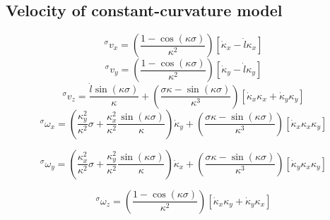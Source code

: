 \chapter{}
\section{Velocity of constant-curvature model}

\begin{equation}
	^\sigma v_x = \left( \frac{1 - \cos(\kappa \sigma)}{\kappa^2} \right) \left[ \dot{\kappa}_x - \dot{l}\kappa_x  \right]
\end{equation}
\begin{equation}
	^\sigma v_y = \left( \frac{1 - \cos(\kappa \sigma)}{\kappa^2} \right) \left[ \dot{\kappa}_y - \dot{l}\kappa_y  \right]
\end{equation}
\begin{equation}
	^\sigma v_z =  \frac{ \dot{l} \sin(\kappa \sigma)}{\kappa}  + \left( \frac{\sigma \kappa - \sin(\kappa \sigma)}{\kappa^3} \right) \left[\dot{\kappa}_x \kappa_x + \dot{\kappa}_y \kappa_y \right]
\end{equation}
\begin{equation}
	^\sigma \omega_x = \left( \frac{\kappa_y^2}{\kappa^2} \sigma + \frac{\kappa_x^2 }{\kappa^2} \frac{\sin(\kappa \sigma)}{\kappa} \right)  \dot{\kappa}_y + \left( \frac{\sigma \kappa - \sin(\kappa \sigma)}{\kappa^3} \right) \left[ \dot{\kappa}_x \kappa_x \kappa_y \right]
\end{equation}

\begin{equation}
	^\sigma \omega_y = \left( \frac{\kappa_x^2}{\kappa^2} \sigma + \frac{\kappa_y^2 }{\kappa^2} \frac{\sin(\kappa \sigma)}{\kappa} \right)  \dot{\kappa}_x + \left( \frac{\sigma \kappa - \sin(\kappa \sigma)}{\kappa^3} \right) \left[ \dot{\kappa}_y \kappa_x \kappa_y \right]
\end{equation}

\begin{equation}
	^\sigma \omega_z = \left( \frac{1 - \cos(\kappa \sigma)}{\kappa^2} \right) \left[ \dot{\kappa}_x \kappa_y + \dot{\kappa}_y \kappa_x \right]
\end{equation}